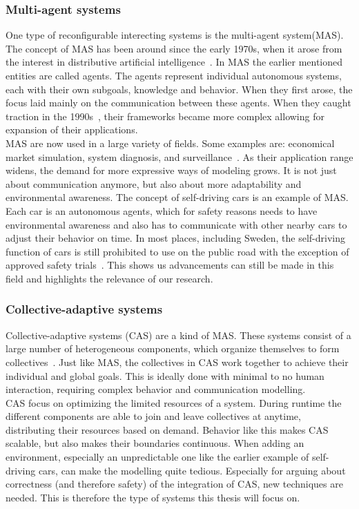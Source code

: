 \subsubsection{Multi-agent systems}
One type of reconfigurable interecting systems is the multi-agent system(MAS). The concept of MAS has been around since the early 1970s, when it arose from the interest in distributive artificial intelligence~\cite{vittikh1970multi}. In MAS the earlier mentioned entities are called agents. The agents represent individual autonomous systems, each with their own subgoals, knowledge and behavior. When they first arose, the focus laid mainly on the communication between these agents. When they caught traction in the 1990s~\cite{ferber1999multi}, their frameworks became more complex allowing for expansion of their applications.\\
MAS are now used in a large variety of fields. Some examples are: economical market simulation, system diagnosis, and surveillance~\cite{xie2017multi}. As their application range widens, the demand for more expressive ways of modeling grows. It is not just about communication anymore, but also about more adaptability and environmental awareness. The concept of self-driving cars is an example of MAS. Each car is an autonomous agents, which for safety reasons needs to have environmental awareness and also has to communicate with other nearby cars to adjust their behavior on time. In most places, including Sweden, the self-driving function of cars is still prohibited to use on the public road with the exception of approved safety trials~\cite{SelfdSE}. This shows us advancements can still be made in this field and highlights the relevance of our research.
\\
\subsubsection{Collective-adaptive systems}
Collective-adaptive systems (CAS) are a kind of MAS. These systems consist of a large number of heterogeneous components, which organize themselves to form collectives~\cite{ferscha2015collective}. Just like MAS, the collectives in CAS work together to achieve their individual and global goals. This is ideally done with minimal to no human interaction, requiring complex behavior and communication modelling.
\\
CAS focus on optimizing the limited resources of a system. During runtime the different components are able to join and leave collectives at anytime, distributing their resources based on demand. Behavior like this makes CAS scalable, but also makes their boundaries continuous. When adding an environment, especially an unpredictable one like the earlier example of self-driving cars, can make the modelling quite tedious. Especially for arguing about correctness (and therefore safety) of the integration of CAS, new techniques are needed. This is therefore the type of systems this thesis will focus on.
\\
